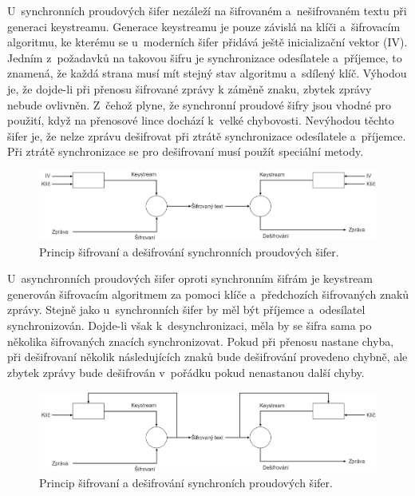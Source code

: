 U~synchronních proudových šifer nezáleží na šifrovaném a~nešifrovaném textu při generaci keystreamu. Generace keystreamu je pouze závislá na klíči a~šifrovacím algoritmu, ke kterému se u~moderních šifer přidává ještě inicializační vektor (IV).\cite{EncyclopediaSynchronous} Jedním z~požadavků na takovou šifru je synchronizace odesílatele a~příjemce, to znamená, že každá strana musí mít stejný stav algoritmu a~sdílený klíč. Výhodou je, že dojde-li při přenosu šifrované zprávy k záměně znaku, zbytek zprávy nebude ovlivněn. Z~čehož plyne, že synchronní proudové šifry jsou vhodné pro použití, když na přenosové lince dochází k~velké chybovosti. Nevýhodou těchto šifer je, že nelze zprávu dešifrovat při ztrátě synchronizace odesílatele a~příjemce. Při ztrátě synchronizace se pro dešifrovaní musí použít speciální metody. \cite{HavlicekBakalarka}
\begin{figure}[!h]
  \begin{center}
    \includegraphics[scale=0.3]{obrazky/synchronousCipher.png}
  \end{center}
  \caption[Synchronní proudová šifra]{Princip šifrovaní a dešifrování synchronních proudových šifer.\cite{EncyclopediaSynchronous}}
  \label{img:synchoronstream}
\end{figure}

U~asynchronních proudových šifer oproti synchronním šifrám je keystream generován šifrovacím algoritmem za pomoci klíče a~předchozích šifrovaných znaků zprávy. Stejně jako u~synchronních šifer by měl být příjemce a~odesílatel synchronizován. Dojde-li však k~desynchronizaci, měla by se šifra sama po několika šifrovaných znacích synchronizovat. Pokud při přenosu nastane chyba, při dešifrovaní několik následujících znaků bude dešifrování provedeno chybně, ale zbytek zprávy bude dešifrován v~pořádku pokud nenastanou další chyby.\cite{HavlicekBakalarka} %
\begin{figure}[!h]
  \begin{center}
    \includegraphics[scale=0.3]{obrazky/asynchronousCipher.png}
  \end{center}
  \caption[Asynchroní proudová šifra]{Princip šifrovaní a dešifrování synchroních proudových šifer.\cite{EncyclopediaAsynchronous}}
  \label{img:asynchronstream}
\end{figure}

